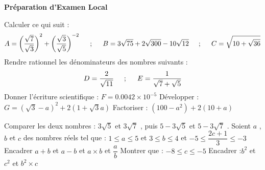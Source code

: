 \documentclass[a4paper,addpoints,12pt]{exam}
\begin{document}
\begin{tcolorbox}[enhanced,colback=white,colframe=black] 
{\begin{center}\Large \textbf{ Préparation d'Examen Local  }\end{center}}
\end{tcolorbox}
\begin{exo}
\begin{questions}
\question Calculer ce qui suit :
$$
A=\left( \dfrac{\sqrt{7}}{\sqrt{3}}\right)^{2}+\left( \dfrac{\sqrt{3}}{\sqrt{5}}\right)^{-2}  
\hspace{0.5cm};\hspace{0.5cm}
B=3\sqrt{75}+2\sqrt{300}-10\sqrt{12}
\hspace{0.5cm};\hspace{0.5cm}
C=\sqrt{10+\sqrt{36}}
$$
\question Rendre rationnel les dénominateurs des nombres suivants : 
$$
D=\dfrac{2}{\sqrt{11}}
\hspace{0.5cm};\hspace{0.5cm}
E=\dfrac{1}{\sqrt{7}+\sqrt{5}}
$$
\question Donner l'écriture scientifique : $F=0.0042 \times 10^{-5}$
\question Développer  :$G=(\sqrt{3}-a)^{2}+2(1+\sqrt{3}a)$ 
\question Factoriser : $(100-a^{2})+2(10+a)$
\end{questions}
\end{exo}

\begin{exo}
\begin{questions}
\question Comparer les deux nombres : $3\sqrt{5}$ et $3\sqrt{7}$ , puis  $5-3\sqrt{5}$ et $5-3\sqrt{7}$ .\newline
Soient $a$ , $b$ et $c$ des nombres réels tel que  : $1\leq a \leq 5$ et $3\leq b \leq 4$ et $-5 \leq \dfrac{2c+1}{3} \leq -3$ 
\question Encadrer $a+b$ et $a-b$ et $a\times b$ et $\dfrac{a}{b}$
\question Montrer que  : $-8\leq c \leq -5$
\question Encadrer :$b^{2}$ et $c^{2}$ et $b^{2}\times c$
\end{questions}
\end{exo}
\end{document}
